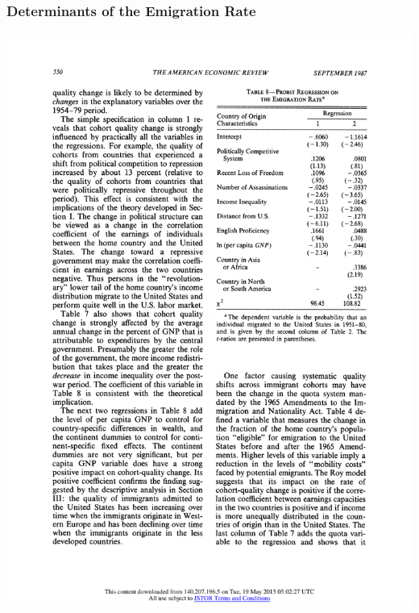 \documentclass[10pt]{beamer}
\begin{document}
\begin{frame}[c]\frametitle{Determinants of the Emigration Rate}

\centerline{\includegraphics[height=0.8\textheight]{ProbReg.pdf}}

\end{frame}
\end{document}
